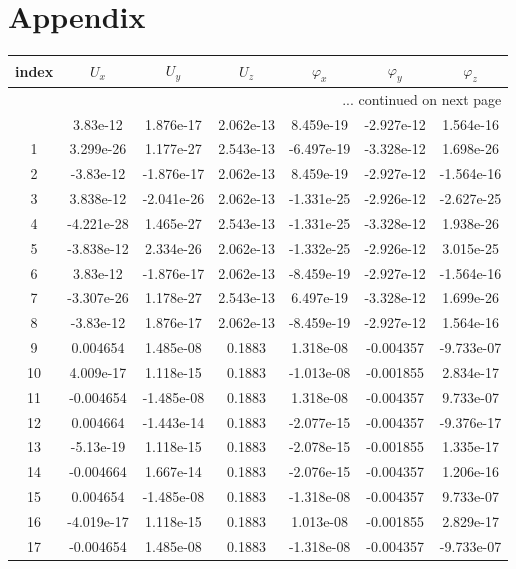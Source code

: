 \documentclass{article}%
\begin{document}
\section{Appendix}%
\label{sec:Appendix}%
\begin{longtable}{| c | c c c c c c |}%
\hline%
index&$U_x$&$U_y$&$U_z$&$\varphi_x$&$\varphi_y$&$\varphi_z$\\%
\hline%
\endhead%
\hline%
\multicolumn{7}{r}{... continued on next page}\\%
\endfoot%
\hline%
\endlastfoot%
0&3.83e{-}12&1.876e{-}17&2.062e{-}13&8.459e{-}19&{-}2.927e{-}12&1.564e{-}16\\%
1&3.299e{-}26&1.177e{-}27&2.543e{-}13&{-}6.497e{-}19&{-}3.328e{-}12&1.698e{-}26\\%
2&{-}3.83e{-}12&{-}1.876e{-}17&2.062e{-}13&8.459e{-}19&{-}2.927e{-}12&{-}1.564e{-}16\\%
3&3.838e{-}12&{-}2.041e{-}26&2.062e{-}13&{-}1.331e{-}25&{-}2.926e{-}12&{-}2.627e{-}25\\%
4&{-}4.221e{-}28&1.465e{-}27&2.543e{-}13&{-}1.331e{-}25&{-}3.328e{-}12&1.938e{-}26\\%
5&{-}3.838e{-}12&2.334e{-}26&2.062e{-}13&{-}1.332e{-}25&{-}2.926e{-}12&3.015e{-}25\\%
6&3.83e{-}12&{-}1.876e{-}17&2.062e{-}13&{-}8.459e{-}19&{-}2.927e{-}12&{-}1.564e{-}16\\%
7&{-}3.307e{-}26&1.178e{-}27&2.543e{-}13&6.497e{-}19&{-}3.328e{-}12&1.699e{-}26\\%
8&{-}3.83e{-}12&1.876e{-}17&2.062e{-}13&{-}8.459e{-}19&{-}2.927e{-}12&1.564e{-}16\\%
9&0.004654&1.485e{-}08&0.1883&1.318e{-}08&{-}0.004357&{-}9.733e{-}07\\%
10&4.009e{-}17&1.118e{-}15&0.1883&{-}1.013e{-}08&{-}0.001855&2.834e{-}17\\%
11&{-}0.004654&{-}1.485e{-}08&0.1883&1.318e{-}08&{-}0.004357&9.733e{-}07\\%
12&0.004664&{-}1.443e{-}14&0.1883&{-}2.077e{-}15&{-}0.004357&{-}9.376e{-}17\\%
13&{-}5.13e{-}19&1.118e{-}15&0.1883&{-}2.078e{-}15&{-}0.001855&1.335e{-}17\\%
14&{-}0.004664&1.667e{-}14&0.1883&{-}2.076e{-}15&{-}0.004357&1.206e{-}16\\%
15&0.004654&{-}1.485e{-}08&0.1883&{-}1.318e{-}08&{-}0.004357&9.733e{-}07\\%
16&{-}4.019e{-}17&1.118e{-}15&0.1883&1.013e{-}08&{-}0.001855&2.829e{-}17\\%
17&{-}0.004654&1.485e{-}08&0.1883&{-}1.318e{-}08&{-}0.004357&{-}9.733e{-}07\\%

\end{longtable}
\end{document}
